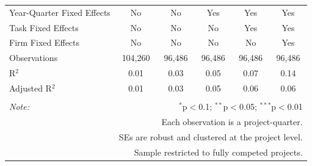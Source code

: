 \documentclass[
]{article}
\begin{document}
\begin{table}[H]
\begin{tabular}{@{\extracolsep{-2pt}}lccccc}
Year-Quarter Fixed Effects & No & No & Yes & Yes & Yes \\ 
Task Fixed Effects & No & No & No & Yes & Yes \\ 
Firm Fixed Effects & No & No & No & No & Yes \\ 
Observations & 104,260 & 96,486 & 96,486 & 96,486 & 96,486 \\ 
R$^{2}$ & 0.01 & 0.03 & 0.05 & 0.07 & 0.14 \\ 
Adjusted R$^{2}$ & 0.01 & 0.03 & 0.05 & 0.06 & 0.06 \\ 
\hline 
\hline \\[-1.8ex] 
\textit{Note:}  & \multicolumn{5}{r}{$^{*}$p$<$0.1; $^{**}$p$<$0.05; $^{***}$p$<$0.01} \\ 
 & \multicolumn{5}{r}{Each observation is a project-quarter.} \\ 
 & \multicolumn{5}{r}{SEs are robust and clustered at the project level.} \\ 
 & \multicolumn{5}{r}{Sample restricted to fully competed projects.} \\ 
\end{tabular} 
\end{table}
\end{document}
